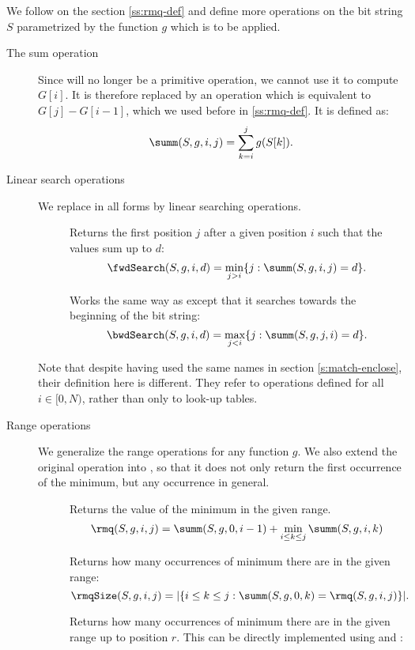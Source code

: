 We follow on the section \ref{ss:rmq-def} and define more operations on the bit string $S$ parametrized by the function $g$ which is to be applied.
\begin{description}
	\item[The sum operation]
	Since \rank{} will no longer be a primitive operation, we cannot use it to compute $G[i]$.
	It is therefore replaced by an operation \summ{} which is equivalent to $G[j] - G[i - 1]$, which we used before in \ref{ss:rmq-def}.
	It is defined as:
	$$ \summ(S, g, i, j) = \sum_{k=i}^j g(S[k]). $$
	
	\item[Linear search operations]
	We replace \select{} in all forms by linear searching operations.
	\begin{description}
		\item[\fwdSearch{}]
		Returns the first position $j$ after a given position $i$ such that the values sum up to $d$:
		$$ \fwdSearch(S, g, i, d) = \min_{j > i} \{j : \summ(S, g, i, j) = d\}. $$
		
		\item[\bwdSearch{}]
		Works the same way as \fwdSearch{} except that it searches towards the beginning of the bit string:
		$$ \bwdSearch(S, g, i, d) = \max_{j < i} \{j : \summ(S, g, j, i) = d\}. $$
	\end{description}
	
	Note that despite having used the same names in section \ref{s:match-enclose}, their definition here is different.
	They refer to operations defined for all $i \in [0, N)$, rather than only to look-up tables. 
	
	\item[Range operations]
	We generalize the range operations for any function $g$.
	We also extend the original operation \rmqi{} into \rmqSelect{}, so that it does not only return the first occurrence of the minimum, but any occurrence in general.
	
	\begin{description}
		\item[\rmq{}]
		Returns the value of the minimum in the given range.
		$$\rmq(S, g, i, j) = \summ(S, g, 0, i - 1) + \min_{i \le k \le j} \summ(S, g, i, k)$$

		\item[\rmqSize{}]
		Returns how many occurrences of minimum there are in the given range:
		$$\rmqSize(S, g, i, j) = | \{i \le k \le j : \summ(S, g, 0, k) = \rmq(S, g, i, j) \} |. $$
		
		\item[\rmqRank{}]
		Returns how many occurrences of minimum there are in the given range up to position $r$.
		This can be directly implemented using \rmq{} and \rmqSize{}:
		\begin{algorithm}
		\begin{algorithmic}
				\State {}
			\Else
				\State {}
			\EndIf
		\EndFunction
		\end{algorithmic}
		\end{algorithm}
		

\end{description}
\end{description}
